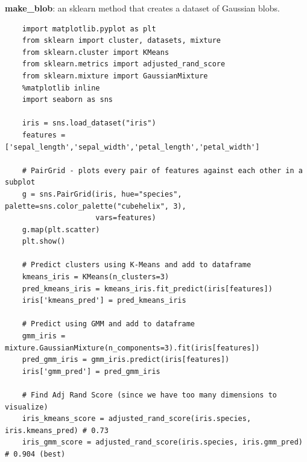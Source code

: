 \documentclass[11pt, a4paper]{article}
\begin{document}
\begin{spacing}{1.1}
	\noindent \textbf{make\_blob}: an sklearn method that creates a dataset of Gaussian blobs.
	\begin{lstlisting}
	import matplotlib.pyplot as plt
	from sklearn import cluster, datasets, mixture
	from sklearn.cluster import KMeans
	from sklearn.metrics import adjusted_rand_score
	from sklearn.mixture import GaussianMixture
	%matplotlib inline
	import seaborn as sns
	
	iris = sns.load_dataset("iris")
	features = ['sepal_length','sepal_width','petal_length','petal_width']
	
	# PairGrid - plots every pair of features against each other in a subplot
	g = sns.PairGrid(iris, hue="species", palette=sns.color_palette("cubehelix", 3),  
	                 vars=features)
	g.map(plt.scatter)
	plt.show()
	
	# Predict clusters using K-Means and add to dataframe
	kmeans_iris = KMeans(n_clusters=3)
	pred_kmeans_iris = kmeans_iris.fit_predict(iris[features])
	iris['kmeans_pred'] = pred_kmeans_iris
	
	# Predict using GMM and add to dataframe
	gmm_iris = mixture.GaussianMixture(n_components=3).fit(iris[features])
	pred_gmm_iris = gmm_iris.predict(iris[features])
	iris['gmm_pred'] = pred_gmm_iris
	
	# Find Adj Rand Score (since we have too many dimensions to visualize)
	iris_kmeans_score = adjusted_rand_score(iris.species, iris.kmeans_pred) # 0.73
	iris_gmm_score = adjusted_rand_score(iris.species, iris.gmm_pred) # 0.904 (best)
	\end{lstlisting} \vspace*{2mm}
	

\end{spacing}
\end{document}
